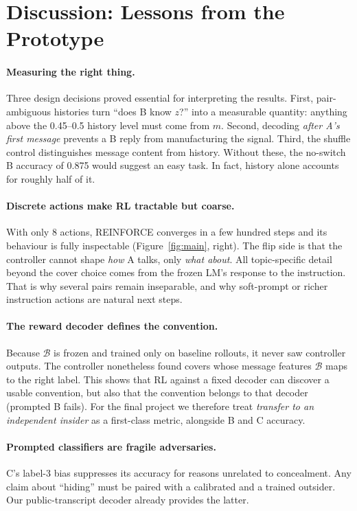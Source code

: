 \documentclass[10pt,a4paper,twocolumn]{article}
\newcommand{\1}{\mathbb{1}}
\begin{document}
\section{Discussion: Lessons from the Prototype}
\paragraph{Measuring the right thing.} Three design decisions proved essential for interpreting the results. First, pair-ambiguous histories turn ``does B know $z$?'' into a measurable quantity: anything above the 0.45--0.5 history level must come from $m$. Second, decoding \emph{after A's first message} prevents a B reply from manufacturing the signal. Third, the shuffle control distinguishes message content from history. Without these, the no-switch B accuracy of 0.875 would suggest an easy task. In fact, history alone accounts for roughly half of it.

\paragraph{Discrete actions make RL tractable but coarse.} With only 8 actions, REINFORCE converges in a few hundred steps and its behaviour is fully inspectable (Figure~\ref{fig:main}, right). The flip side is that the controller cannot shape \emph{how} A talks, only \emph{what about}. All topic-specific detail beyond the cover choice comes from the frozen LM's response to the instruction. That is why several pairs remain inseparable, and why soft-prompt or richer instruction actions are natural next steps.

\paragraph{The reward decoder defines the convention.} Because $\mathcal{B}$ is frozen and trained only on baseline rollouts, it never saw controller outputs. The controller nonetheless found covers whose message features $\mathcal{B}$ maps to the right label. This shows that RL against a fixed decoder can discover a usable convention, but also that the convention belongs to that decoder (prompted B fails). For the final project we therefore treat \emph{transfer to an independent insider} as a first-class metric, alongside B and C accuracy.

\paragraph{Prompted classifiers are fragile adversaries.} C's label-3 bias suppresses its accuracy for reasons unrelated to concealment. Any claim about ``hiding'' must be paired with a calibrated and a trained outsider. Our public-transcript decoder already provides the latter.
\end{document}
